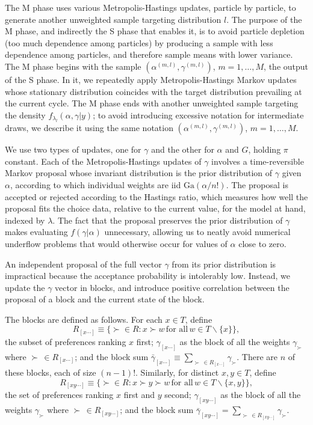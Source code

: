 \documentclass[11pt,letter]{article}
\begin{document}
The M phase uses various Metropolis-Hastings updates, particle by particle, to generate another unweighted sample targeting distribution $l$.
The purpose of the M phase, and indirectly the S phase that enables it, is to avoid particle depletion (too much dependence among particles) by producing a sample with less dependence among particles, and therefore sample means with lower variance.
The M phase begins with the sample $(\alpha^{(m,l)}, \gamma^{(m,l)})$, $m=1,\ldots,M$, the output of the S phase.
In it, we repeatedly apply Metropolis-Hastings Markov updates whose stationary distribution coincides with the target distribution prevailing at the current cycle.
The M phase ends with another unweighted sample targeting the density $f_{\lambda_l}(\alpha,\gamma|y)$; to avoid introducing excessive notation for intermediate draws, we describe it using the same notation $(\alpha^{(m,l)}, \gamma^{(m,l)})$, $m=1,\ldots,M$.

We use two types of updates, one for $\gamma$ and the other for $\alpha$ and $G$, holding $\pi$ constant.
Each of the Metropolis-Hastings updates of $\gamma$ involves a time-reversible Markov proposal whose invariant distribution is the prior distribution of $\gamma$ given $\alpha$, according to which individual weights are iid $\mathrm{Ga}(\alpha/n!)$.
The proposal is accepted or rejected according to the Hastings ratio, which measures how well the proposal fits the choice data, relative to the current value, for the model at hand, indexed by $\lambda$.
The fact that the proposal preserves the prior distribution of $\gamma$ makes evaluating $f(\gamma|\alpha)$ unnecessary, allowing us to neatly avoid numerical underflow problems that would otherwise occur for values of $\alpha$ close to zero.

An independent proposal of the full vector $\gamma$ from its prior distribution is impractical because the acceptance probability is intolerably low.
Instead, we update the $\gamma$ vector in blocks, and introduce positive correlation between the proposal of a block and the current state of the block.

The blocks are defined as follows.
For each $x \in T$, define
\[
  R_{[x\cdots]} \equiv \{\succ \in R \colon x \succ w\,\mbox{for all}\, w \in T\backslash\{x\}\},
\]
the subset of preferences ranking $x$ first; $\gamma_{[x\cdots]}$ as the block of all the weights $\gamma_\succ$ where $\succ\, \in R_{[x\cdots]}$; and the block sum $\bar{\gamma}_{[x\cdots]} \equiv \sum_{\succ\, \in R_{[x\cdots]}} \gamma_\succ$.
There are $n$ of these blocks, each of size $(n-1)!$.
Similarly, for distinct $x,y \in T$, define
\[
  R_{[xy\cdots]} \equiv \{\succ \in R \colon x \succ y \succ w\,\mbox{for all}\, w \in T\backslash\{x,y\}\},
\]
the set of preferences ranking $x$ first and $y$ second; $\gamma_{[xy\cdots]}$ as the block of all the weights $\gamma_\succ$ where $\succ\, \in R_{[xy\cdots]}$; and the block sum $\bar{\gamma}_{[xy\cdots]} = \sum_{\succ\, \in R_{[xy\cdots]}} \gamma_\succ$.
\end{document}
